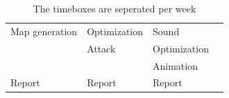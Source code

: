 \begin{table}[h]
\begin{tabular}{llll}
Map generation                       & Optimization                          & Sound                                 &                                       \\
                                     & Attack                                & Optimization                          &                                       \\
                                     &                                       & Animation                             &                                       \\
Report                               & Report                                & Report                                &                                      
\end{tabular}
\caption{The timeboxes are seperated per week}
\end{table}
